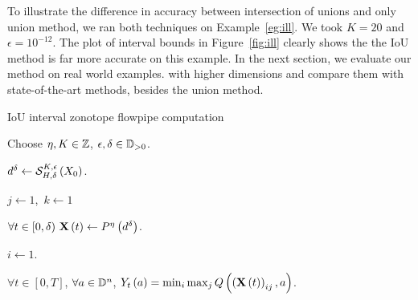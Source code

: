 To illustrate the difference in accuracy between intersection of
unions and only union method, we ran both techniques on
Example~\ref{eg:ill}.  We took $K=20$ and $\epsilon = 10^{-12}$.  The
plot of interval bounds in Figure~\ref{fig:ill} clearly shows the the
IoU method is far more accurate on this example.  In the next section,
we evaluate our method on real world examples. with higher dimensions
and compare them with state-of-the-art methods, besides the union
method.
%
\begin{algorithm}\caption{IoU interval zonotope
flowpipe computation}\label{alg:main}


Choose $\eta,K\in\mathbb{Z}$, $\epsilon,\delta\in\mathbb{D}_{>0}$.

$d^\delta \gets \mathcal{S}_{H,\delta}^{K,\epsilon}\left(X_0\right)$.

$j\gets 1$,~$k\gets 1$\;~\label{algstep:assign1}

$\forall t\in[0,\delta)~\mathbf{X}\left(t\right)\gets P^{\eta}\left(d^\delta\right)$.~\label{algstep:assign2}

$i\gets 1.$

\While{$i\delta\leq N$}{
\For{ $j\in \rows{\iouopt{\eta}{X_0}}$ and $k\in\cols{\iouopt{\eta}{X_0}}$ ~~(\% In parallel)}{

$\rb{\tr{X}{i\delta}}_{jk} \gets {\flow{H}{\delta}{K}{\epsilon}{\rb{\tr{X}{(i-1)\delta}}_{jk}}}$.~\label{step:1}

}
$\tr{X}{i\delta} \gets \refine\rb{\tr{X}{(i)\delta}}$

$\forall t\in[0,t)~\tr{X}{t} \gets \tr{X}{(i)\delta}$~\label{step:2}

$i \gets i+1$.
}
$\forall t\in[0,T]$, $\forall a\in\mathbb{D}^n$, $Y_{t}\left(a\right)
= \min_i\max_jQ\left(\left(\mathbf{X}\left(t\right)\right)_{ij},a\right)$.~\label{step:proj}
\end{algorithm}
%
